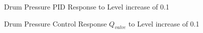     \begin{figure}[ht]
        \begin{center}
            \caption{Drum Pressure PID Response to Level increase of 0.1}
            \label{fig:PID_Pressure_LvlStep}
        \end{center}
    \end{figure}  %
    \begin{figure}[ht]
        \begin{center}
            \caption{Drum Pressure Control Response $Q_{valve}$ to Level increase of 0.1}
            \label{fig:PID_Pressure_LvlStep_Control}
        \end{center}
    \end{figure}  %
    
